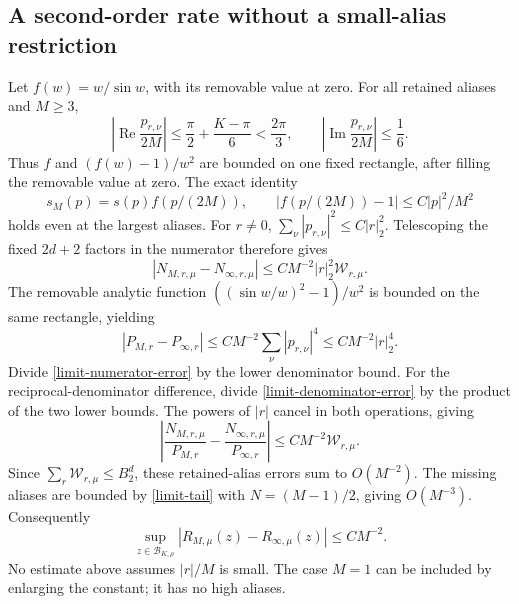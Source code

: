 \documentclass[11pt]{article}
\theoremstyle{remark}
\begin{document}
\subsection{A second-order rate without a small-alias restriction}

Let $f(w)=w/\sin w$, with its removable value at zero. For all
retained aliases and $M\ge3$,
\begin{equation}\label{limit-compact-rectangle}
 \left|\operatorname{Re}\frac{p_{r,\nu}}{2M}\right|
 \le\frac\pi2+\frac{K-\pi}{6}<\frac{2\pi}3,
 \qquad
 \left|\operatorname{Im}\frac{p_{r,\nu}}{2M}\right|\le\frac16.
\end{equation}
Thus $f$ and $(f(w)-1)/w^2$ are bounded on one fixed rectangle,
after filling the removable value at zero. The exact identity
\begin{equation}\label{limit-factor-comparison}
 s_M(p)=s(p)f(p/(2M)),\qquad
 |f(p/(2M))-1|\le C|p|^2/M^2
\end{equation}
holds even at the largest aliases. For $r\ne0$,
$\sum_\nu|p_{r,\nu}|^2\le C|r|_2^2$. Telescoping the fixed
$2d+2$ factors in the numerator therefore gives
\begin{equation}\label{limit-numerator-error}
 |N_{M,r,\mu}-N_{\infty,r,\mu}|
 \le CM^{-2}|r|_2^2\mathcal W_{r,\mu}.
\end{equation}
The removable analytic function
$((\sin w/w)^2-1)/w^2$ is bounded on the same rectangle, yielding
\begin{equation}\label{limit-denominator-error}
 |P_{M,r}-P_{\infty,r}|
 \le CM^{-2}\sum_\nu|p_{r,\nu}|^4
 \le CM^{-2}|r|_2^4.
\end{equation}
Divide \eqref{limit-numerator-error} by the lower denominator bound.
For the reciprocal-denominator difference, divide
\eqref{limit-denominator-error} by the product of the two lower
bounds. The powers of $|r|$ cancel in both operations, giving
\begin{equation}\label{limit-summand-error}
 \left|\frac{N_{M,r,\mu}}{P_{M,r}}
       -\frac{N_{\infty,r,\mu}}{P_{\infty,r}}\right|
 \le CM^{-2}\mathcal W_{r,\mu}.
\end{equation}
Since $\sum_r\mathcal W_{r,\mu}\le B_2^d$, these retained-alias
errors sum to $O(M^{-2})$. The missing aliases are bounded by
\eqref{limit-tail} with $N=(M-1)/2$, giving $O(M^{-3})$. Consequently
\begin{equation}\label{limit-remainder-rate}
 \sup_{z\in\mathcal B_{K,\rho}}
 |R_{M,\mu}(z)-R_{\infty,\mu}(z)|\le CM^{-2}.
\end{equation}
No estimate above assumes $|r|/M$ is small. The case $M=1$ can be
included by enlarging the constant; it has no high aliases.
\end{document}
